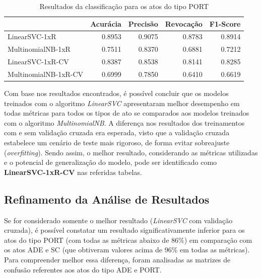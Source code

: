\begin{table}[h]
\caption{Resultados da classificação para os atos do tipo PORT}
\label{tab:resultados-port}
	\begin{center}
	\begin{tabular}{lrrrr}
		\toprule
		{} &  Acurácia &  Precisão &  Revocação &      F1-Score \\
		\midrule
		LinearSVC-1xR        &    0.8953 &    0.9075 &     0.8783 &  0.8914 \\
		MultinomialNB-1xR    &    0.7511 &    0.8370 &     0.6881 &  0.7212 \\
		LinearSVC-1xR-CV     &    0.8387 &    0.8538 &     0.8141 &  0.8285 \\
		MultinomialNB-1xR-CV &    0.6999 &    0.7850 &     0.6410 &  0.6619 \\
		\bottomrule
	\end{tabular}
	\end{center}		
\end{table}

Com base nos resultados encontrados, é possível concluir que os modelos treinados com o algoritmo \textit{LinearSVC} apresentaram melhor desempenho em todas métricas para todos os tipos de ato se comparados aos modelos treinados com o algoritmo \textit{MultinomialNB}. A diferença nos resultados dos treinamentos com e sem validação cruzada era esperada, visto que a validação cruzada estabelece um cenário de teste mais rigoroso, de forma evitar sobreajuste (\textit{overfitting}). Sendo assim, o melhor resultado, considerando as métricas utilizadas e o potencial de generalização do modelo, pode ser identificado como \textbf{LinearSVC-1xR-CV} nas referidas tabelas. 

\subsection{Refinamento da Análise de Resultados}

Se for considerado somente o melhor resultado (\textit{LinearSVC} com validação cruzada), é possível constatar um resultado significativamente inferior para os atos do tipo PORT (com todas as métricas abaixo de 86\%) em comparação com os atos ADE e SC (que obtiveram valores acima de 96\% em todas as métricas). Para compreender melhor essa diferença, foram analisadas as matrizes de confusão referentes aos atos do tipo ADE e PORT.

